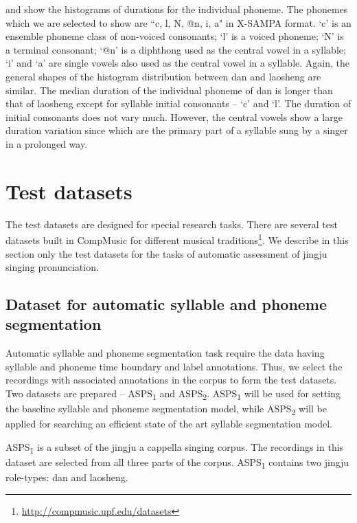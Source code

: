 and  show the histograms of durations for the individual phoneme. The phonemes which we are selected to show are ``c, l, N, @n, i, a" in \gls{X-SAMPA} format. `c' is an ensemble phoneme class of non-voiced consonants; `l' is a voiced phoneme; `N' is a terminal consonant; `@n' is a diphthong used as the central vowel in a syllable; `i' and `a' are single vowels also used as the central vowel in a syllable. Again, the general shapes of the histogram distribution between \gls{dan} and \gls{laosheng} are similar. The median duration of the individual phoneme of \gls{dan} is longer than that of \gls{laosheng} except for syllable initial consonants -- `c' and `l'. The duration of initial consonants does not vary much. However, the central vowels show a large duration variation since which are the primary part of a syllable sung by a singer in a prolonged way.

\section{Test datasets}\label{sec:ch4:test_datasets}
The test datasets are designed for special research tasks. There are several test datasets built in CompMusic for different musical traditions\footnote{\url{http://compmusic.upf.edu/datasets}}. We describe in this section only the test datasets for the tasks of automatic assessment of jingju singing pronunciation.

\subsection{Dataset for automatic syllable and phoneme segmentation}\label{sec:ch4:dataset_segmentation}

Automatic syllable and phoneme segmentation task require the data having syllable and phoneme time boundary and label annotations. Thus, we select the recordings with associated annotations in the corpus to form the test datasets. Two datasets are prepared -- \gls{ASPS}\textsubscript{1} and \gls{ASPS}\textsubscript{2}. \gls{ASPS}\textsubscript{1} will be used for setting the baseline syllable and phoneme segmentation model, while \gls{ASPS}\textsubscript{2} will be applied for searching an efficient state of the art syllable segmentation model.

\gls{ASPS}\textsubscript{1} is a subset of the jingju a cappella singing corpus. The recordings in this dataset are selected from all three parts of the corpus. \gls{ASPS}\textsubscript{1} contains two jingju role-types: \gls{dan} and \gls{laosheng}. 

